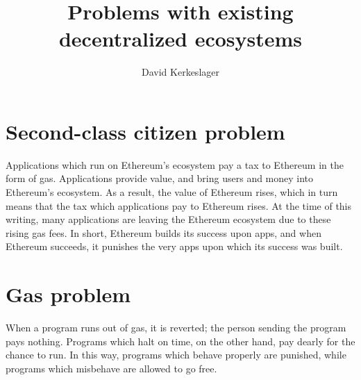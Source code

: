 \documentclass[12pt,letterpaper]{article}
\title{Problems with existing decentralized ecosystems}
\author{David Kerkeslager}
\date{}
\begin{document}
\begin{titlepage}
\maketitle
\end{titlepage}

\section{Second-class citizen problem}
Applications which run on Ethereum's ecosystem pay a tax to Ethereum in the
form of gas. Applications provide value, and bring users and money into
Ethereum's ecosystem. As a result, the value of Ethereum rises, which in turn
means that the tax which applications pay to Ethereum rises. At the time of
this writing, many applications are leaving the Ethereum ecosystem due to
these rising gas fees. In short, Ethereum builds its success upon apps, and
when Ethereum succeeds, it punishes the very apps upon which its success was
built.

\section{Gas problem}
When a program runs out of gas, it is reverted; the person sending the program
pays nothing. Programs which halt on time, on the other hand, pay dearly for
the chance to run. In this way, programs which behave properly are punished,
while programs which misbehave are allowed to go free.
\end{document}
